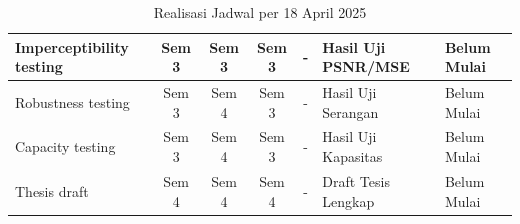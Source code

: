 \documentclass{ittelkom}
\begin{document}
\begin{table}[h]
\begin{tabular}{|l|c|c|c|c|l|l|}
        Imperceptibility testing                                                & Sem 3                                                 & Sem 3                                                    & Sem 3                                                                       & -                                                                         & Hasil Uji PSNR/MSE                            & Belum Mulai                                   \\ \hline
        \rowcolor[HTML]{EFEFEF}
        Robustness testing                                                      & Sem 3                                                 & Sem 4                                                    & Sem 3                                                                       & -                                                                         & Hasil Uji Serangan                            & Belum Mulai                                   \\ \hline
        Capacity testing                                                        & Sem 3                                                 & Sem 4                                                    & Sem 3                                                                       & -                                                                         & Hasil Uji Kapasitas                           & Belum Mulai                                   \\ \hline
        \rowcolor[HTML]{EFEFEF}
        Thesis draft                                                            & Sem 4                                                 & Sem 4                                                    & Sem 4                                                                       & -                                                                         & Draft Tesis Lengkap                           & Belum Mulai                                   \\ \hline
    \end{tabular}
    \caption{Realisasi Jadwal per 18 April 2025}
\end{table}
\end{document}
